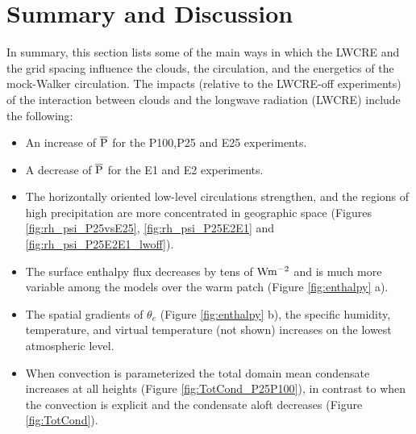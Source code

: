 \documentclass[draft]{agujournal2019}
\begin{document}
{\section{Summary and Discussion} %

In summary, this section lists some of the main ways in which the LWCRE and the grid spacing influence
the clouds, the circulation, and the energetics of the mock-Walker circulation.   
The impacts (relative to the LWCRE-off experiments) of the interaction between clouds and the longwave radiation 
(LWCRE) include the following: 

\begin{itemize}
  \item An increase of $\overline{\rm{P}}$  for the P100,P25 and E25 experiments.
  \item A decrease of $\overline{\rm{P}}$  for the E1 and E2 experiments.
  \item The horizontally oriented low-level circulations strengthen, and the regions of high precipitation are more concentrated  
  in geographic space (Figures \ref{fig:rh_psi_P25vsE25}, \ref{fig:rh_psi_P25E2E1} and \ref{fig:rh_psi_P25E2E1_lwoff}).  
  \item The surface enthalpy flux decreases by tens of $\rm{W m^{-2}}$ and is much more variable among the models over the warm patch (Figure \ref{fig:enthalpy} a).
  \item The spatial gradients of $\theta_e$ (Figure \ref{fig:enthalpy} b), the specific humidity, temperature, and virtual temperature 
  (not shown) increases on the lowest atmospheric level.  
  \item When convection is parameterized the total domain mean condensate increases at all heights 
  (Figure \ref{fig:TotCond_P25P100}), in contrast to when the convection is explicit and 
  the condensate aloft decreases (Figure \ref{fig:TotCond}).    
\end{itemize}

}
\end{document}
